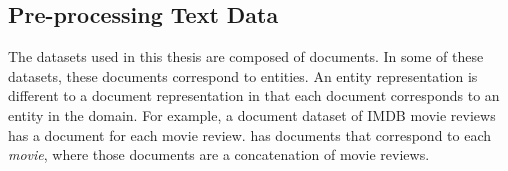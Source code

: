 



\subsection{Pre-processing Text Data}\label{ch2:data}


The datasets used in this thesis are composed of documents. In some of these datasets, these documents correspond to entities. An entity representation is different to a document representation in that each document corresponds to an entity in the domain. For example, a document dataset of IMDB movie reviews has a document for each movie review.  has  documents that correspond to each \textit{movie}, where those documents are a concatenation of movie reviews.








